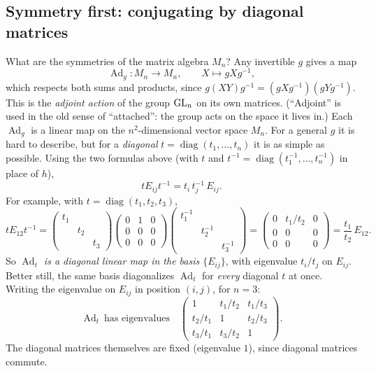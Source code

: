 \subsection*{Symmetry first: conjugating by diagonal matrices}
What are the symmetries of the matrix algebra $M_n$? Any invertible $g$ gives a map
\[
  \operatorname{Ad}_g\colon M_n\to M_n,\qquad X\mapsto gXg^{-1},
\]
which respects both sums and products, since $g(XY)g^{-1}=(gXg^{-1})(gYg^{-1})$. This is the
\emph{adjoint action} of the group $\mathrm{GL}_n$ on its own matrices. (``Adjoint'' is used in the old sense
of ``attached'': the group acts on the space it lives in.) Each $\operatorname{Ad}_g$ is a linear map on
the $n^2$-dimensional vector space $M_n$. For a general $g$ it is hard to describe, but for a
\emph{diagonal} $t=\operatorname{diag}(t_1,\dots,t_n)$ it is as simple as possible. Using the two
formulas above (with $t$ and $t^{-1}=\operatorname{diag}(t_1^{-1},\dots,t_n^{-1})$ in place of $h$),
\[
  tE_{ij}t^{-1}=t_i\,t_j^{-1}\,E_{ij}.
\]
For example, with $t=\operatorname{diag}(t_1,t_2,t_3)$,
\[
  tE_{12}t^{-1}=
  \begin{pmatrix}t_1&&\\&t_2&\\&&t_3\end{pmatrix}
  \begin{pmatrix}0&1&0\\0&0&0\\0&0&0\end{pmatrix}
  \begin{pmatrix}t_1^{-1}&&\\&t_2^{-1}&\\&&t_3^{-1}\end{pmatrix}
  =\begin{pmatrix}0&t_1/t_2&0\\0&0&0\\0&0&0\end{pmatrix}=\frac{t_1}{t_2}\,E_{12}.
\]
So \emph{$\operatorname{Ad}_t$ is a diagonal linear map in the basis $\{E_{ij}\}$}, with eigenvalue
$t_i/t_j$ on $E_{ij}$. Better still, the same basis diagonalizes $\operatorname{Ad}_t$ for \emph{every}
diagonal $t$ at once. Writing the eigenvalue on $E_{ij}$ in position $(i,j)$, for $n=3$:
\[
  \operatorname{Ad}_t\ \text{has eigenvalues}\quad
  \begin{pmatrix}1&t_1/t_2&t_1/t_3\\ t_2/t_1&1&t_2/t_3\\ t_3/t_1&t_3/t_2&1\end{pmatrix}.
\]
The diagonal matrices themselves are fixed (eigenvalue $1$), since diagonal matrices commute.

